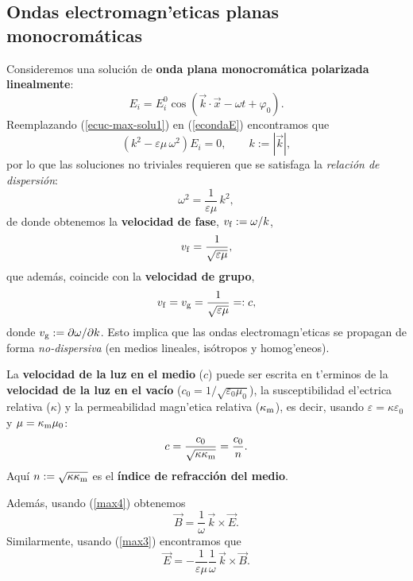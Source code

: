 \subsection{Ondas electromagn'eticas planas monocromáticas}
Consideremos una solución de \textbf{onda plana monocromática polarizada linealmente}:
\begin{equation}
E_i=E_i^0 \cos\left(\vec{k}\cdot\vec{x}-\omega t+\varphi_0\right)
.\label{ecuc-max-solu1}%
\end{equation}
Reemplazando (\ref{ecuc-max-solu1}) en (\ref{econdaE}) encontramos que%
\begin{equation}
\left(k^2-\varepsilon\mu\,\omega^2\right)  E_i=0, \qquad k:=|\vec{k}|,
\end{equation}
por lo que las soluciones no triviales requieren que se satisfaga la
\textit{relación de dispersión}:
\begin{equation}
\omega^2=\frac{1}{\varepsilon\mu}\,k^2, \label{rdoem}
\end{equation}
de donde obtenemos la \textbf{velocidad de fase},
$v_{\rm f}:=\omega/k$,
\begin{equation}
v_{\rm f}=\frac{1}{\sqrt{\varepsilon\mu}},
\end{equation}
que además, coincide con la \textbf{velocidad de grupo}, 
\begin{equation}
v_{\rm f}=v_{\rm g}=\frac{1}{\sqrt{\varepsilon\mu}}=:c,
\end{equation}
donde $v_{\rm g}:=\partial\omega/\partial k$. Esto implica que las ondas electromagn'eticas se propagan de forma \textit{no-dispersiva} (en medios lineales, isótropos y homog'eneos). 

La \textbf{velocidad de la luz en el medio} ($c$) puede ser escrita en t'erminos de la \textbf{velocidad de la luz en el vacío} ($c_0=1/\sqrt{\varepsilon_0\mu_0}$), la susceptibilidad el'ectrica relativa ($\kappa$) y la permeabilidad magn'etica relativa ($\kappa_{\rm m}$), es decir, usando $\varepsilon=\kappa\varepsilon_0$ y $\mu=\kappa_{\rm m}\mu_0$:
\begin{equation}
c=\frac{c_0}{\sqrt{\kappa\kappa_{\rm m}}}=\frac{c_0}{n}.
\end{equation}
Aquí $n:=\sqrt{\kappa\kappa_{\rm m}}$ es el \textbf{índice de refracción del medio}.

Además, usando (\ref{max4}) obtenemos
\begin{equation}\label{BkE}
 \vec{B}=\frac{1}{\omega}\,\vec{k}\times\vec{E}.
\end{equation}
Similarmente, usando (\ref{max3}) encontramos que
\begin{equation}
 \vec{E}=-\frac{1}{\varepsilon\mu}\frac{1}{\omega}\,\vec{k}\times\vec{B}.
\end{equation}

